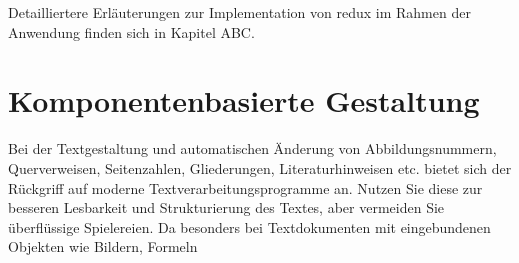 Detailliertere Erläuterungen zur Implementation von redux im Rahmen der Anwendung finden sich in Kapitel ABC.

\section{Komponentenbasierte Gestaltung}
Bei der Textgestaltung und automatischen Änderung von Abbildungsnummern, Querverweisen,
Seitenzahlen, Gliederungen, Literaturhinweisen etc. bietet sich der Rückgriff
auf moderne Textverarbeitungsprogramme an. Nutzen Sie diese zur besseren Lesbarkeit
und Strukturierung des Textes, aber vermeiden Sie überflüssige Spielereien. Da
besonders bei Textdokumenten mit eingebundenen Objekten wie Bildern, Formeln
